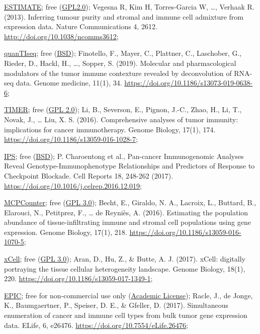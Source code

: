 \documentclass[
  12pt,
]{book}
\begin{document}
\href{https://bioinformatics.mdanderson.org/public-software/estimate/}{ESTIMATE}; free (\href{https://bioinformatics.mdanderson.org/estimate/}{GPL2.0}); Vegesna R, Kim H, Torres-Garcia W, \ldots, Verhaak R. (2013). Inferring tumour purity and stromal and immune cell admixture from expression data. Nature Communications 4, 2612. \url{http://doi.org/10.1038/ncomms3612};

\href{http://icbi.at/software/quantiseq/doc/index.html}{quanTIseq}; free (\href{https://github.com/icbi-lab/immunedeconv/blob/master/LICENSE.md}{BSD}); Finotello, F., Mayer, C., Plattner, C., Laschober, G., Rieder, D., Hackl, H., \ldots, Sopper, S. (2019). Molecular and pharmacological modulators of the tumor immune contexture revealed by deconvolution of RNA-seq data. Genome medicine, 11(1), 34. \url{https://doi.org/10.1186/s13073-019-0638-6};

\href{http://cistrome.org/TIMER/}{TIMER}; free (\href{http://cistrome.org/TIMER/download.html}{GPL 2.0}); Li, B., Severson, E., Pignon, J.-C., Zhao, H., Li, T., Novak, J., \ldots{} Liu, X. S. (2016). Comprehensive analyses of tumor immunity: implications for cancer immunotherapy. Genome Biology, 17(1), 174. \url{https://doi.org/10.1186/s13059-016-1028-7};

\href{https://github.com/icbi-lab/Immunophenogram}{IPS}; free (\href{https://github.com/icbi-lab/Immunophenogram/blob/master/LICENSE}{BSD}); P. Charoentong et al., Pan-cancer Immunogenomic Analyses Reveal Genotype-Immunophenotype Relationships and Predictors of Response to Checkpoint Blockade. Cell Reports 18, 248-262 (2017). \url{https://doi.org/10.1016/j.celrep.2016.12.019};

\href{https://github.com/ebecht/MCPcounter}{MCPCounter}; free (\href{https://github.com/ebecht/MCPcounter/blob/master/Source/License}{GPL 3.0}); Becht, E., Giraldo, N. A., Lacroix, L., Buttard, B., Elarouci, N., Petitprez, F., \ldots{} de Reyniès, A. (2016). Estimating the population abundance of tissue-infiltrating immune and stromal cell populations using gene expression. Genome Biology, 17(1), 218. \url{https://doi.org/10.1186/s13059-016-1070-5};

\href{http://xcell.ucsf.edu/}{xCell}; free (\href{https://github.com/dviraran/xCell/blob/master/DESCRIPTION}{GPL 3.0}); Aran, D., Hu, Z., \& Butte, A. J. (2017). xCell: digitally portraying the tissue cellular heterogeneity landscape. Genome Biology, 18(1), 220. \url{https://doi.org/10.1186/s13059-017-1349-1};

\href{https://gfellerlab.shinyapps.io/EPIC_1-1/}{EPIC}; free for non-commercial use only (\href{https://github.com/GfellerLab/EPIC/blob/master/LICENSE}{Academic License}); Racle, J., de Jonge, K., Baumgaertner, P., Speiser, D. E., \& Gfeller, D. (2017). Simultaneous enumeration of cancer and immune cell types from bulk tumor gene expression data. ELife, 6, e26476. \url{https://doi.org/10.7554/eLife.26476};
\end{document}

